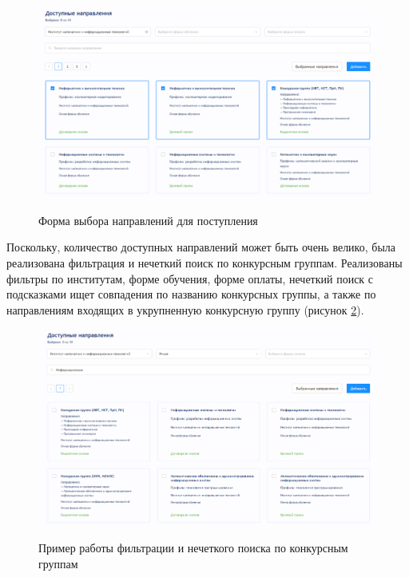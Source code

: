 \begin{figure}[H]
\begin{center}
\includegraphics[width=0.9\hsize]{fig/choice-program.png}\\[2mm]
\caption{Форма выбора направлений для поступления}\label{fig:choiceprogram}
\end{center}
\end{figure}

Поскольку, количество доступных направлений может быть очень велико, была реализована фильтрация и нечеткий поиск по конкурсным группам. Реализованы фильтры по институтам, форме обучения, форме оплаты, нечеткий поиск с подсказками ищет совпадения по названию конкурсных группы, а также по направлениям входящих в укрупненную конкурсную группу (рисунок \ref{fig:choiceprogramfilter}).

\begin{figure}[H]
\begin{center}
\includegraphics[width=0.9\hsize]{fig/programms.png}\\[2mm]
\caption{Пример работы фильтрации и нечеткого поиска по конкурсным группам}\label{fig:choiceprogramfilter}
\end{center}
\end{figure}

